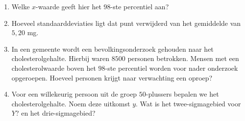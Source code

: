 
\begin{enumerate}[label=(\alph*)]
    \item Welke $x$-waarde geeft hier het $98$-ste percentiel aan?
    \answer{

    }

    \item Hoeveel standaarddeviaties ligt dat punt verwijderd van het gemiddelde van $5,20$ mg.
    \answer{

    }

    \item In een gemeente wordt een bevolkingsonderzoek gehouden naar het cholesterolgehalte.
    Hierbij waren $8 500$ personen betrokken.
    Mensen met een cholesterolwaarde boven het $98$-ste percentiel worden voor nader onderzoek opgeroepen.
    Hoeveel personen krijgt naar verwachting een oproep?
    \answer{

    }

    \item Voor een willekeurig persoon uit de groep $50$-plussers bepalen we het cholesterolgehalte.
    Noem deze uitkomst $y$.
    Wat is het twee-sigmagebied voor $Y$? en het drie-sigmagebied?
    \answer{

    }
\end{enumerate}